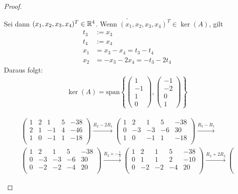 \begin{proof}
\begin{parts}
\[	.\]
	Sei dann $(x_1,x_2,x_3,x_4)^T\in \mathbb{R}^4$. Wenn $(x_1,x_2,x_3,x_4)^T\in \ker(A)$, gilt
	\begin{align*}
		t_3&:= x_3\\
		t_4&:= x_4\\
		x_1&=x_3-x_4=t_3-t_4\\
		x_2&=-x_3-2x_4=-t_3-2t_4
	\end{align*}
	Daraus folgt:
	\begin{align*}
	\ker(A)=\text{span}\left\{ \begin{pmatrix} 1 \\ -1 \\ 1 \\ 0 \end{pmatrix} ,\begin{pmatrix} -1 \\ -2 \\ 0 \\ 1 \end{pmatrix}  \right\} 
	\end{align*}	
\item 
	\begin{gather*}
\left(
\begin{array}{cccc|c}
 1 & 2 & 1 & 5 & -38 \\
 2 & 1 & -1 & 4 & -46 \\
 1 & 0 & -1 & 1 & -18 \\
\end{array}
\right) \xrightarrow{R_2-2R_1} \left(
\begin{array}{cccc|c}
 1 & 2 & 1 & 5 & -38 \\
 0 & -3 & -3 & -6 & 30 \\
 1 & 0 & -1 & 1 & -18 \\
\end{array}
\right) \xrightarrow{R_3-R_1}\\\left(
\begin{array}{cccc|c}
 1 & 2 & 1 & 5 & -38 \\
 0 & -3 & -3 & -6 & 30 \\
 0 & -2 & -2 & -4 & 20 \\
\end{array}
\right) \xrightarrow{R_2\times -\frac{1}{3}} \left(
\begin{array}{cccc|c}
 1 & 2 & 1 & 5 & -38 \\
 0 & 1 & 1 & 2 & -10 \\
 0 & -2 & -2 & -4 & 20 \\
\end{array}
\right) \xrightarrow{R_3+2R_2} \left(

\end{gather*}
\end{parts}
\end{proof}
